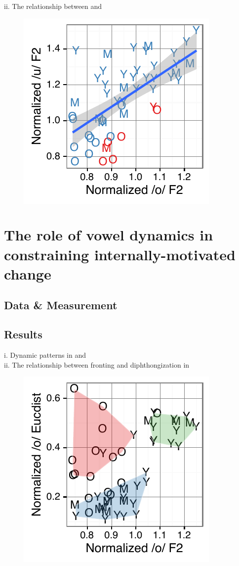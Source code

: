 \documentclass[PWPL]{article}
\begin{document}
ii. The relationship between  and \\

\begin{figure}[H]
\centering
\includegraphics{ow_uw_small.pdf}
\end{figure}
\newpage
\section{The role of vowel dynamics in constraining internally-motivated change}
\subsection{Data \& Measurement}
\subsection{Results}
i. Dynamic patterns in  and \\
ii. The relationship between fronting and diphthongization in \\

\begin{figure}[H]
\centering
\includegraphics{ow_front_dip_small.pdf}
\end{figure}
\end{document}
